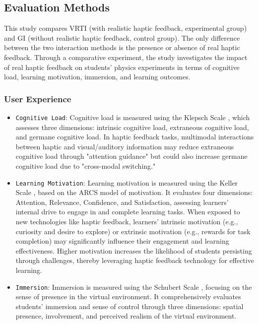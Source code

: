 \documentclass[sigconf,review,anonymous]{acmart}
\begin{document}
\subsection{Evaluation Methods}
This study compares VRTI (with realistic haptic feedback, experimental group) and GI (without realistic haptic feedback, control group). The only difference between the two interaction methods is the presence or absence of real haptic feedback. Through a comparative experiment, the study investigates the impact of real haptic feedback on students' physics experiments in terms of cognitive load, learning motivation, immersion, and learning outcomes.

\subsubsection{User Experience}
\begin{itemize}
  \item {\texttt{Cognitive Load}}: Cognitive load is measured using the Klepsch Scale \cite{klepsch2017development}, which assesses three dimensions: intrinsic cognitive load, extraneous cognitive load, and germane cognitive load. In haptic feedback tasks, multimodal interactions between haptic and visual/auditory information may reduce extraneous cognitive load through "attention guidance" but could also increase germane cognitive load due to "cross-modal switching."

  \item {\texttt{Learning Motivation}}: Learning motivation is measured using the Keller Scale \cite{keller1983motivational}, based on the ARCS model of motivation. It evaluates four dimensions: Attention, Relevance, Confidence, and Satisfaction, assessing learners' internal drive to engage in and complete learning tasks. When exposed to new technologies like haptic feedback, learners' intrinsic motivation (e.g., curiosity and desire to explore) or extrinsic motivation (e.g., rewards for task completion) may significantly influence their engagement and learning effectiveness. Higher motivation increases the likelihood of students persisting through challenges, thereby leveraging haptic feedback technology for effective learning.

  \item {\texttt{Immersion}}: Immersion is measured using the Schubert Scale \cite{schubert2001experience}, focusing on the sense of presence in the virtual environment. It comprehensively evaluates students' immersion and sense of control through three dimensions: spatial presence, involvement, and perceived realism of the virtual environment.
\end{itemize}
\end{document}
